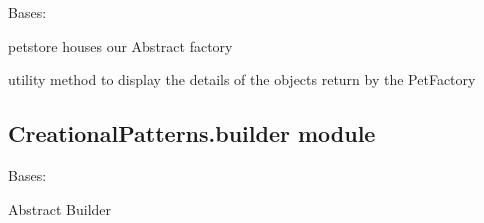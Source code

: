 \documentclass[letterpaper,10pt,english]{sphinxmanual}
\begin{document}
\begin{fulllineitems}
\label{\detokenize{CreationalPatterns:CreationalPatterns.abstractFactory.PetStore}}
\pysigstartsignatures
{}
\pysigstopsignatures
\sphinxAtStartPar
Bases: 

\sphinxAtStartPar
petstore houses our Abstract factory

\begin{fulllineitems}
\label{\detokenize{CreationalPatterns:CreationalPatterns.abstractFactory.PetStore.show_pet}}
\pysigstartsignatures
{}
\pysigstopsignatures
\sphinxAtStartPar
utility method to display the details of the objects return by the PetFactory

\end{fulllineitems}


\end{fulllineitems}



\subsection{CreationalPatterns.builder module}
\label{\detokenize{CreationalPatterns:module-CreationalPatterns.builder}}\label{\detokenize{CreationalPatterns:creationalpatterns-builder-module}}

\begin{fulllineitems}
\label{\detokenize{CreationalPatterns:CreationalPatterns.builder.Builder}}
\pysigstartsignatures
{}
\pysigstopsignatures
\sphinxAtStartPar
Bases: 

\sphinxAtStartPar
Abstract Builder

\begin{fulllineitems}
\label{\detokenize{CreationalPatterns:CreationalPatterns.builder.Builder.create_new_car}}
\pysigstartsignatures
{}
\pysigstopsignatures
\end{fulllineitems}


\end{fulllineitems}
\end{document}
